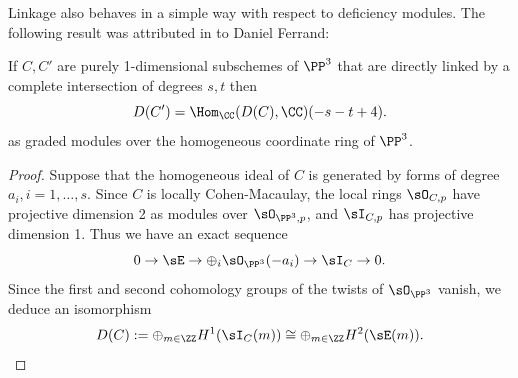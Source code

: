 Linkage also behaves in a simple way with respect to deficiency modules. The following result was attributed in \cite{MR364271} to Daniel Ferrand:

\begin{theorem}\label{HR}
If $C,C'$ are purely 1-dimensional subschemes of $\PP^3$ that are directly linked by a complete intersection of degrees $s,t$ then
$$
D(C') = \Hom_\CC(D(C), \CC) (-s-t+4).
$$ 
as graded modules over the homogeneous coordinate ring of $\PP^3$.
\end{theorem}

\begin{proof}
Suppose that the homogeneous ideal of $C$ is generated by forms of degree $a_i, i=1,\dots,s$. Since $C$ is locally Cohen-Macaulay,
the local rings $\sO_{C,p}$ have projective dimension 2 as modules over $\sO_{\PP^3, p}$, and $\sI_{C,p}$ has projective dimension 1.
Thus we have an exact sequence
$$
0\to \sE \to \oplus_i\sO_{\PP^3}(-a_i) \to \sI_C \to 0.
$$
Since the first and second cohomology groups of the twists of $\sO_{\PP^3}$ vanish, we deduce an isomorphism
$$
D(C) := \oplus_{m\in \ZZ} H^1(\sI_C(m)) \cong \oplus_{m\in \ZZ} H^2(\sE(m)).
$$


\end{proof}
